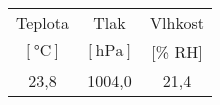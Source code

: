 \begin{tabular}{ccc}                                                    \toprule
Teplota                 &   Tlak                    &   Vlhkost     \\
$[\si{\degreeCelsius}]$ &   $[\si{\hecto\pascal}]$  &   [\% RH]     \\  \midrule
23,8                    &   1004,0                  &   21,4        \\  \bottomrule
\end{tabular}